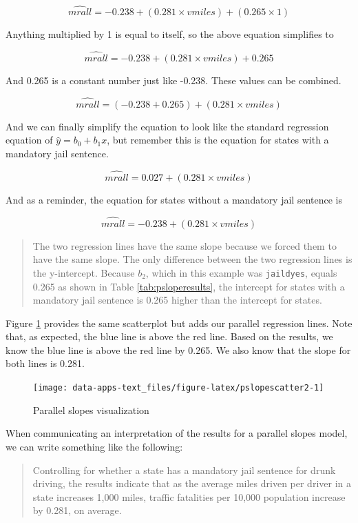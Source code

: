 \documentclass[
]{book}
\begin{document}
\[\hat{mrall} = -0.238 + (0.281 \times vmiles) + (0.265 \times 1)\]

Anything multiplied by 1 is equal to itself, so the above equation simplifies to

\[\hat{mrall} = -0.238 + (0.281 \times vmiles) + 0.265\]

And 0.265 is a constant number just like -0.238. These values can be combined.

\[\hat{mrall} = (-0.238 + 0.265) + (0.281\times vmiles)\]

And we can finally simplify the equation to look like the standard regression equation of \(\hat{y} = b_0 + b_1x\), but remember this is the equation for states with a mandatory jail sentence.

\[\hat{mrall} = 0.027 + (0.281\times vmiles)\]

And as a reminder, the equation for states without a mandatory jail sentence is

\[\hat{mrall} = -0.238 + (0.281\times vmiles)\]

\begin{quote}
The two regression lines have the same slope because we forced them to have the same slope. The only difference between the two regression lines is the y-intercept. Because \(b_2\), which in this example was \texttt{jaildyes}, equals 0.265 as shown in Table \ref{tab:psloperesults}, the intercept for states with a mandatory jail sentence is 0.265 higher than the intercept for states.
\end{quote}

Figure \ref{fig:pslopescatter2} provides the same scatterplot but adds our parallel regression lines. Note that, as expected, the blue line is above the red line. Based on the results, we know the blue line is above the red line by 0.265. We also know that the slope for both lines is 0.281.

\begin{figure}

{\centering \texttt{[image: data-apps-text\_files/figure-latex/pslopescatter2-1]} 

}

\caption{Parallel slopes visualization}\label{fig:pslopescatter2}
\end{figure}

When communicating an interpretation of the results for a parallel slopes model, we can write something like the following:

\begin{quote}
Controlling for whether a state has a mandatory jail sentence for drunk driving, the results indicate that as the average miles driven per driver in a state increases 1,000 miles, traffic fatalities per 10,000 population increase by 0.281, on average.
\end{quote}
\end{document}
